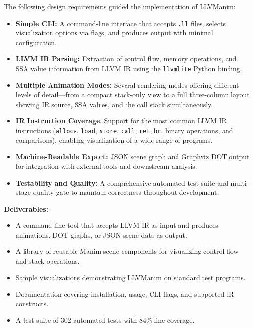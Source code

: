 The following design requirements guided the implementation of LLVManim:

\begin{itemize}
  \item \textbf{Simple CLI:} A command-line interface that accepts \texttt{.ll} files, selects visualization options via flags, and produces output with minimal configuration.

  \item \textbf{LLVM IR Parsing:} Extraction of control flow, memory operations, and SSA value information from LLVM IR using the \texttt{llvmlite}\cite{llvmlite} Python binding.

  \item \textbf{Multiple Animation Modes:} Several rendering modes offering different levels of detail---from a compact stack-only view to a full three-column layout showing IR source, SSA values, and the call stack simultaneously.

  \item \textbf{IR Instruction Coverage:} Support for the most common LLVM IR instructions (\texttt{alloca}, \texttt{load}, \texttt{store}, \texttt{call}, \texttt{ret}, \texttt{br}, binary operations, and comparisons), enabling visualization of a wide range of programs.

  \item \textbf{Machine-Readable Export:} JSON scene graph and Graphviz DOT output for integration with external tools and downstream analysis.

  \item \textbf{Testability and Quality:} A comprehensive automated test suite and multi-stage quality gate to maintain correctness throughout development.
\end{itemize}

\begin{samepage}
  \textbf{Deliverables:}
  \begin{itemize}
  \item A command-line tool that accepts LLVM IR as input and produces animations, DOT graphs, or JSON scene data as output.
  \item A library of reusable Manim scene components for visualizing control flow and stack operations.
  \item Sample visualizations demonstrating LLVManim on standard test programs.
  \item Documentation covering installation, usage, CLI flags, and supported IR constructs.
  \item A test suite of 302 automated tests with 84\% line coverage.
  \end{itemize}
\end{samepage}
